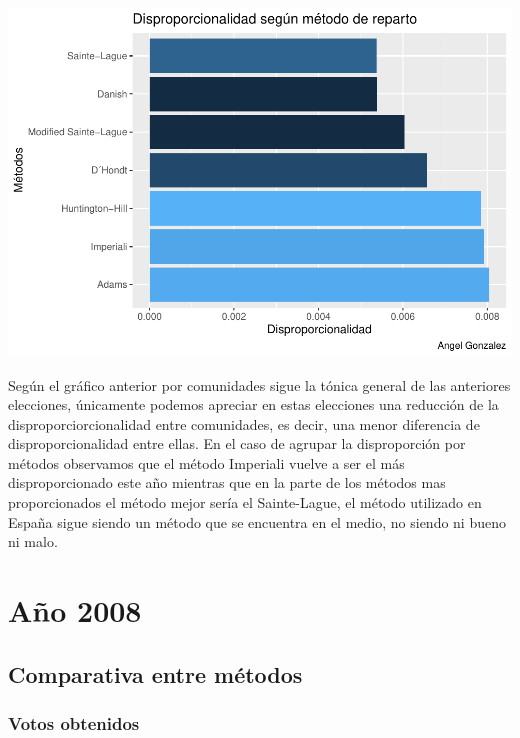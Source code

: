 \documentclass[12pt,a4paper,]{book}
\numberwithin{dummy}{section}
\theoremstyle{ocrenumbox}
\theoremstyle{blacknumex}
\theoremstyle{blacknumbox}
\theoremstyle{ocrenum}
\theoremstyle{ocrenum}
\begin{document}
\begin{center}\includegraphics[width=0.95\linewidth]{figurasR/unnamed-chunk-84-2} \end{center}

Según el gráfico anterior por comunidades sigue la tónica general de las
anteriores elecciones, únicamente podemos apreciar en estas elecciones
una reducción de la disproporciorcionalidad entre comunidades, es decir,
una menor diferencia de disproporcionalidad entre ellas. En el caso de
agrupar la disproporción por métodos observamos que el método Imperiali
vuelve a ser el más disproporcionado este año mientras que en la parte
de los métodos mas proporcionados el método mejor sería el Sainte-Lague,
el método utilizado en España sigue siendo un método que se encuentra en
el medio, no siendo ni bueno ni malo.

\hypertarget{auxf1o-2008}{%
\section{Año 2008}\label{auxf1o-2008}}

\hypertarget{comparativa-entre-muxe9todos-9}{%
\subsection{Comparativa entre
métodos}\label{comparativa-entre-muxe9todos-9}}

\hypertarget{votos-obtenidos-9}{%
\subsubsection{Votos obtenidos}\label{votos-obtenidos-9}}
\end{document}
